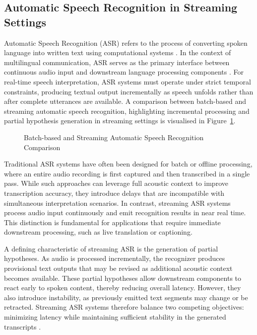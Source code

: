 \subsection{Automatic Speech Recognition in Streaming Settings}

Automatic Speech Recognition (ASR) refers to the process of converting spoken language into written text using computational systems \cite{nayeem2025asr_survey}. In the context of multilingual communication, ASR serves as the primary interface between continuous audio input and downstream language processing components \cite{8252104}. For real-time speech interpretation, ASR systems must operate under strict temporal constraints, producing textual output incrementally as speech unfolds rather than after complete utterances are available. A comparison between batch-based and streaming automatic speech recognition, highlighting incremental processing and partial hypothesis generation in streaming settings is visualised in Figure~\ref{fig:streaming_vs_batch_asr}.

\begin{figure}[!htbp]
  \centering
  
  \caption[Batch-based and Streaming Automatic Speech Recognition Comparison]{Batch-based and Streaming Automatic Speech Recognition Comparison}
  \label{fig:streaming_vs_batch_asr}
\end{figure}

Traditional ASR systems have often been designed for batch or offline processing, where an entire audio recording is first captured and then transcribed in a single pass. While such approaches can leverage full acoustic context to improve transcription accuracy, they introduce delays that are incompatible with simultaneous interpretation scenarios. In contrast, streaming ASR systems process audio input continuously and emit recognition results in near real time. This distinction is fundamental for applications that require immediate downstream processing, such as live translation or captioning.

A defining characteristic of streaming ASR is the generation of partial hypotheses. As audio is processed incrementally, the recognizer produces provisional text outputs that may be revised as additional acoustic context becomes available. These partial hypotheses allow downstream components to react early to spoken content, thereby reducing overall latency. However, they also introduce instability, as previously emitted text segments may change or be retracted. Streaming ASR systems therefore balance two competing objectives: minimizing latency while maintaining sufficient stability in the generated transcripts \cite{weller2021streamingST}.

